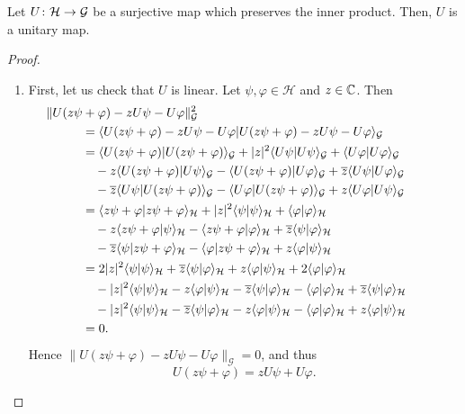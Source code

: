 \begin{proposition}
Let $U\colon\mathcal{H}\to\mathcal{G}$ be a surjective map which preserves the inner product. Then, $U$ is a unitary map.  
\end{proposition}

\begin{proof}
\begin{enumerate}[label=(\roman*)]
\item First, let us check that $U$ is linear. Let $\psi,\varphi\in \mathcal{H}$ and $z\in \mathbb{C}$. Then
\begin{align*}
&\hspace{-10mm}
\|U(z\psi+\varphi)-zU\psi-U\varphi\|_{\mathcal{G}}^2 \\
& = \langle U(z\psi+\varphi)-zU\psi-U\varphi|U(z\psi+\varphi)-zU\psi-U\varphi\rangle_{\mathcal{G}}\\
& = \langle U(z\psi+\varphi)|U(z\psi+\varphi)\rangle_{\mathcal{G}}
+ |z|^2\langle U\psi|U\psi\rangle_{\mathcal{G}}
+\langle U\varphi|U\varphi\rangle_{\mathcal{G}}\\
&\quad -z\langle U(z\psi+\varphi)|U\psi\rangle_{\mathcal{G}}
-\langle U(z\psi+\varphi)|U\varphi\rangle_{\mathcal{G}}
+\overline{z}\langle U\psi|U\varphi\rangle_{\mathcal{G}}\\
&\quad -\overline{z}\langle U\psi|U(z\psi+\varphi)\rangle_{\mathcal{G}}-\langle U\varphi|U(z\psi+\varphi)\rangle_{\mathcal{G}} + z\langle U\varphi|U\psi\rangle_{\mathcal{G}}\pagebreak\\
& = \langle z\psi+\varphi|z\psi+\varphi\rangle_{\mathcal{H}}
+ |z|^2\langle \psi|\psi\rangle_{\mathcal{H}}
+\langle \varphi|\varphi\rangle_{\mathcal{H}}\\
&\quad -z\langle z\psi+\varphi|\psi\rangle_{\mathcal{H}}
-\langle z\psi+\varphi|\varphi\rangle_{\mathcal{H}}
+\overline{z}\langle \psi|\varphi\rangle_{\mathcal{H}}\\
&\quad -\overline{z}\langle \psi|z\psi+\varphi\rangle_{\mathcal{H}}
-\langle \varphi|z\psi+\varphi\rangle_{\mathcal{H}}
+ z\langle \varphi|\psi\rangle_{\mathcal{H}}\\
& = 2|z|^2\langle \psi|\psi\rangle_{\mathcal{H}}
+\overline{z} \langle \psi|\varphi\rangle_{\mathcal{H}}
+z \langle\varphi |\psi\rangle_{\mathcal{H}}
+2\langle \varphi|\varphi\rangle_{\mathcal{H}}\\
&\quad -|z|^2\langle \psi|\psi\rangle_{\mathcal{H}}
-z\langle \varphi|\psi\rangle_{\mathcal{H}}
-\overline{z}\langle \psi|\varphi\rangle_{\mathcal{H}}
-\langle \varphi|\varphi\rangle_{\mathcal{H}}
+\overline{z}\langle \psi|\varphi\rangle_{\mathcal{H}}\\
&\quad -|z|^2\langle \psi|\psi\rangle_{\mathcal{H}}
-\overline{z}\langle \psi|\varphi\rangle_{\mathcal{H}}
-z\langle \varphi|\psi\rangle_{\mathcal{H}}
-\langle \varphi|\varphi\rangle_{\mathcal{H}}
+ z\langle \varphi|\psi\rangle_{\mathcal{H}}\\
& = 0.
\end{align*}
Hence $\|U(z\psi+\varphi)-zU\psi-U\varphi\|_{\mathcal{G}}=0$, and thus
\begin{equation*}
U(z\psi+\varphi)=zU\psi+U\varphi.
\end{equation*}


\end{enumerate}
\end{proof}
